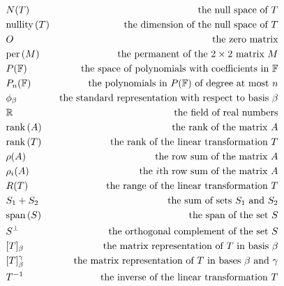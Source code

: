 \begin{align*}
	 & N(T)                   & \text{the null space of $T$}                                          \\
	 & \text{nullity}\left(T\right)            & \text{the dimension of the null space of $T$}                         \\
	 & O                      & \text{the zero matrix}                                                \\
	 & \text{per}\left(M\right)                & \text{the permanent of the $2 \times 2$ matrix $M$}                   \\
	 & P(\mathbb{F})                  & \text{the space of polynomials with coefficients in $\mathbb{F}$}             \\
	 & P_n(\mathbb{F})                & \text{the polynomials in $P(\mathbb{F})$ of degree at most $n$}               \\
	 & \phi_\beta             & \text{the standard representation with respect to basis $\beta$}      \\
	 & \mathbb{R}                     & \text{the field of real numbers}                                      \\
	 & \text{rank}\left(A\right)               & \text{the rank of the matrix $A$}                                     \\
	 & \text{rank}\left(T\right)               & \text{the rank of the linear transformation $T$}                      \\
	 & \rho(A)                & \text{the row sum of the matrix $A$}                                  \\
	 & \rho_i(A)              & \text{the $i$th row sum of the matrix $A$}                            \\
	 & R(T)                   & \text{the range of the linear transformation $T$}                     \\
	 & S_1 + S_2              & \text{the sum of sets $S_1$ and $S_2$}                                \\
	 & \text{span}\left(S\right)              & \text{the span of the set $S$}                                        \\
	 & S^\perp                & \text{the orthogonal complement of the set $S$}                       \\
	 & [T]_\beta              & \text{the matrix representation of $T$ in basis $\beta$}              \\
	 & [T]_\beta^\gamma       & \text{the matrix representation of $T$ in bases $\beta$ and $\gamma$} \\
	 & T^{-1}                 & \text{the inverse of the linear transformation $T$}                   \\
\end{align*}
